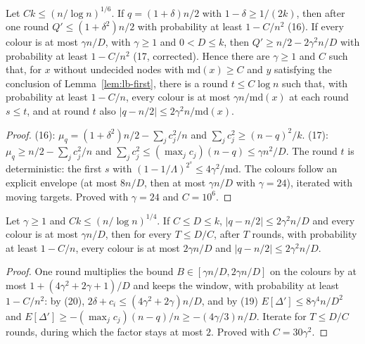 \begin{lemma}\label{lem:lb-descent}
\leanok{}
Let $Ck\le(n/\log n)^{1/6}$. If $q=(1+\delta)n/2$ with $1-\delta\ge1/(2k)$, then after one round
$Q'\le(1+\delta^2)n/2$ with probability at least $1-C/n^2$ (16). If every colour is at most
$\gamma n/D$, with $\gamma\ge1$ and $0<D\le k$, then $Q'\ge n/2-2\gamma^2n/D$ with probability at
least $1-C/n^2$ (17, corrected). Hence there are $\gamma\ge1$ and $C$ such that, for $x$ without
undecided nodes with $\mathrm{md}(x)\ge C$ and $y$ satisfying the conclusion of
Lemma~\ref{lem:lb-first}, there is a round $t\le C\log n$ such that, with probability at least
$1-C/n$, every colour is at most $\gamma n/\mathrm{md}(x)$ at each round $s\le t$, and at round $t$
also $|q-n/2|\le2\gamma^2n/\mathrm{md}(x)$.
\end{lemma}
\begin{proof}\leanok
(16): $\mu_q=(1+\delta^2)n/2-\sum_jc_j^2/n$ and $\sum_jc_j^2\ge(n-q)^2/k$. (17):
$\mu_q\ge n/2-\sum_jc_j^2/n$ and $\sum_jc_j^2\le(\max_jc_j)(n-q)\le\gamma n^2/D$. The round $t$ is
deterministic: the first $s$ with $(1-1/\Lambda)^{2^s}\le4\gamma^2/\mathrm{md}$. The colours follow
an explicit envelope (at most $8n/D$, then at most $\gamma n/D$ with $\gamma=24$), iterated with
moving targets. Proved with $\gamma=24$ and $C=10^6$.
\end{proof}

\begin{lemma}\label{lem:lb-plateau}
\leanok{}
Let $\gamma\ge1$ and $Ck\le(n/\log n)^{1/4}$. If $C\le D\le k$, $|q-n/2|\le2\gamma^2n/D$ and every
colour is at most $\gamma n/D$, then for every $T\le D/C$, after $T$ rounds, with probability at
least $1-C/n$, every colour is at most $2\gamma n/D$ and $|q-n/2|\le2\gamma^2n/D$.
\end{lemma}
\begin{proof}\leanok
One round multiplies the bound $B\in[\gamma n/D,2\gamma n/D]$ on the colours by at most
$1+(4\gamma^2+2\gamma+1)/D$ and keeps the window, with probability at least $1-C/n^2$: by (20),
$2\delta+c_i\le(4\gamma^2+2\gamma)n/D$, and by (19) $E[\Delta']\le 8\gamma^4n/D^2$ and
$E[\Delta']\ge-(\max_jc_j)(n-q)/n\ge-(4\gamma/3)n/D$. Iterate for $T\le D/C$ rounds, during which
the factor stays at most $2$. Proved with $C=30\gamma^2$.
\end{proof}

